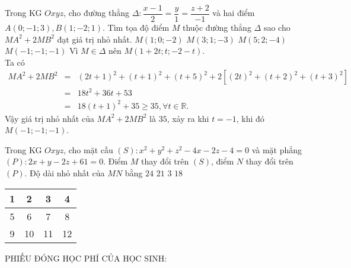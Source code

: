 	\begin{ex}%
	Trong KG $Oxyz$, cho đường thẳng $\Delta \colon \dfrac{x-1}{2}=\dfrac{y}{1}=\dfrac{z+2}{-1}$ và hai điểm $A(0;-1;3), B(1;-2;1)$. Tìm tọa độ điểm $M$ thuộc đường thẳng $\Delta$ sao cho $MA^2+2MB^2$ đạt giá trị nhỏ nhất.
	\choice
	{$M(1;0;-2)$}
	{$M(3;1;-3)$}
	{$M(5;2;-4)$}
	{\True $M(-1;-1;-1)$}
	\loigiai
	{ Vì $M \in \Delta$ nên $M\left( 1+2t;t;-2-t\right)$.\\
	Ta có 
	\begin{eqnarray*}
	MA^2+2MB^2&=&(2t+1)^2+(t+1)^2+(t+5)^2 +2 \left[ (2t)^2+ (t+2)^2 +(t+3)^2\right]\\
	&= & 18t^2 +36t +53\\
	&= & 18(t+1)^2+35 \geq 35, \forall t \in \mathbb{R}.
	\end{eqnarray*}
	Vậy giá trị nhỏ nhất của $MA^2+2MB^2$ là $35$, xảy ra khi $t=-1$, khi đó $M(-1;-1;-1)$.
	}
	\end{ex}
	\begin{ex}%
	Trong KG $Oxyz$, cho mặt cầu $(S)\colon x^2+y^2+z^2-4x-2z-4=0$ và mặt phẳng $(P)\colon 2x+y-2z+61=0$. Điểm $M$ thay đổi trên $(S)$, điểm $N$ thay đổi trên $(P)$. Độ dài nhỏ nhất của $MN$ bằng
	\choice
	{$24$}
	{$21$}
	{$3$}
	{\True $18$}
	\end{ex}

\begin{center}
	\begin{tabular}{|c|c|c|c|}
		\hline 
		1 & 2 & 3&4 \\ \hline
		5 & 6 & 7&8 \\ \hline
		9 & 10 & 11&12 \\ \hline
	\end{tabular}
	\begin{center}
		PHIẾU ĐÓNG HỌC PHÍ CỦA HỌC SINH: 
	\end{center}
\end{center}